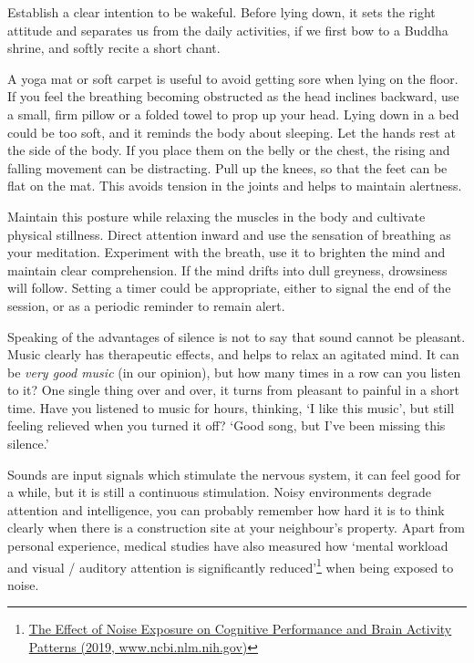 Establish a clear intention to be wakeful. Before lying down, it sets
the right attitude and separates us from the daily activities, if we
first bow to a Buddha shrine, and softly recite a short chant.

\clearpage
\thispagestyle{empty}\mbox{}
\clearpage

A yoga mat or soft carpet is useful to avoid getting sore when lying on
the floor. If you feel the breathing becoming obstructed as the head
inclines backward, use a small, firm pillow or a folded towel to prop up
your head. Lying down in a bed could be too soft, and it reminds the
body about sleeping. Let the hands rest at the side of the body. If you
place them on the belly or the chest, the rising and falling movement
can be distracting. Pull up the knees, so that the feet can be flat on
the mat. This avoids tension in the joints and helps to maintain
alertness.

Maintain this posture while relaxing the muscles in the body and
cultivate physical stillness. Direct attention inward and use the
sensation of breathing as your meditation. Experiment with the breath,
use it to brighten the mind and maintain clear comprehension. If the
mind drifts into dull greyness, drowsiness will follow. Setting a timer
could be appropriate, either to signal the end of the session, or as a
periodic reminder to remain alert.


Speaking of the advantages of silence is not to say that sound cannot be
pleasant. Music clearly has therapeutic effects, and helps to relax an
agitated mind. It can be \emph{very good music} (in our opinion), but
how many times in a row can you listen to it? One single thing over and
over, it turns from pleasant to painful in a short time. Have you
listened to music for hours, thinking, `I like this music', but still
feeling relieved when you turned it off? `Good song, but I've been
missing this silence.'

Sounds are input signals which stimulate the nervous system, it can feel
good for a while, but it is still a continuous stimulation. Noisy
environments degrade attention and intelligence, you can probably
remember how hard it is to think clearly when there is a construction
site at your neighbour's property. Apart from personal experience,
medical studies have also measured how `mental workload and visual /
auditory attention is significantly reduced'\footnote{\href{https://www.ncbi.nlm.nih.gov/pmc/articles/PMC6901841/}{The
  Effect of Noise Exposure on Cognitive Performance and Brain Activity
  Patterns (2019, www.ncbi.nlm.nih.gov)}} when being exposed to noise.

